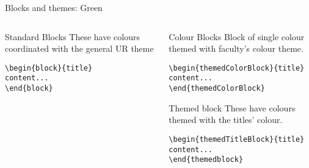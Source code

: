 \begingroup
{}
\begin{frame}[fragile]{Blocks and themes: Green}
\begin{columns} %
\begin{column}{0.3\textwidth}
\begin{block}{Standard Blocks}
These have colours coordinated with the general UR theme
\begin{verbatim}
\begin{block}{title}
content...
\end{block}
\end{verbatim}
\end{block}
\end{column}
\begin{column}{0.7\textwidth}
\begin{themedColorBlock}{Colour Blocks}
Block of single colour themed with faculty's colour theme.
\small
\begin{verbatim}
\begin{themedColorBlock}{title}
content...
\end{themedColorBlock}
\end{verbatim}
\end{themedColorBlock}
\begin{themedTitleBlock} {Themed block}
These have colours themed with the titles' colour.
\small
\begin{verbatim}
\begin{themedTitleBlock}{title}
content...
\end{themedblock}
\end{verbatim}
\end{themedTitleBlock}
\end{column}
\end{columns}
\end{frame}
\endgroup


